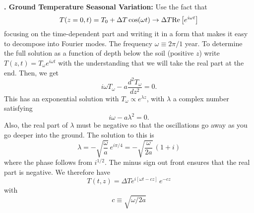 \documentclass[11pt]{book}
\def\be{\begin{equation}}
\def\ee{\end{equation}}
\newcommand{\eql}[1]{\label{eq:#1}}
\newcommand\bee{\begin{enumerate}}
\newcommand\eee{\end{enumerate}}
\newcounter{lectureno}
\newcounter{secno}
\newcommand\lsection[1]{
\addtocounter{secno}{1}
{\bf \arabic{lectureno}.\alph{secno} #1:}}
\begin{document}
%

\lsection{Ground Temperature Seasonal Variation}
Use the fact that
\be T(z=0,t) = T_0 + \Delta T \cos(\omega t) \rightarrow \Delta T {\rm Re}\left[ e^{i\omega t}\right]
\ee
 focusing on the time-dependent part and writing it in a form that makes it easy to decompose into Fourier modes. The frequency $\omega \equiv 2\pi/1$ year. To determine the full solution as a function of depth below the soil (positive $z$) write $T(z,t)= T_\omega e^{i\omega t}$ with the understanding that we will take the real part at the end. Then, we get
\be
i\omega T_\omega - a \frac{d^2T_\omega}{dz^2}=0.\ee
This has an exponential solution with $T_\omega \propto e^{\lambda z}$, with $\lambda$ a complex number satisfying
\be
i\omega - a\lambda^2 = 0.\ee
Also, the real part of $\lambda$ must be negative so that the oscillations go away as you go deeper into the ground. The solution to this is
\be
\lambda = -\sqrt{\frac{\omega}{a}}\, e^{i\pi/4} = - \sqrt{\frac{\omega}{2a}}\, (1+i)
\ee
where the phase follows from $i^{1/2}$. The minus sign out front ensures that the real part is negative. We therefore have
\be
T(t,z) = \Delta T e^{i[\omega t- cz]}\,e^{-cz}
\ee
with
\be
c\equiv \sqrt{\omega/2a}\ee
\end{document}
